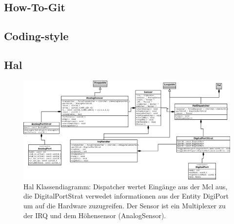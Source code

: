 \documentclass[
   draft=false
  ,paper=a4
  ,twoside=true
  ,fontsize=11pt
  ,headsepline
  ,DIV11
  ,parskip=full+
]{scrartcl} %
\begin{document}
\subsection{How-To-Git}

\subsection{Coding-style}

%
\subsection{Hal}
\begin{figure}[H]
  	\centering
    \includegraphics[width=\textwidth]{./IMG/hal.png}
    \caption[HalLayer]{Hal Klassendiagramm: Dispatcher wertet Eingänge aus der Mcl aus, die DigitalPortStrat verwedet informationen aus der Entity DigiPort um auf die Hardware zuzugreifen. Der Sensor ist ein Multiplexer zu der IRQ und dem Höhensensor (AnalogSensor).}
     \label{fig:serial}
\end{figure}
\end{document}
